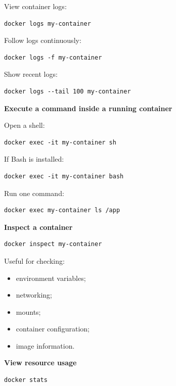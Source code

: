 \documentclass[11pt,letterpaper]{article}
\begin{document}
View container logs:

\begin{lstlisting}
docker logs my-container
\end{lstlisting}

Follow logs continuously:

\begin{lstlisting}
docker logs -f my-container
\end{lstlisting}

Show recent logs:

\begin{lstlisting}
docker logs --tail 100 my-container
\end{lstlisting}

\textbf{Execute a command inside a running container}

Open a shell:

\begin{lstlisting}
docker exec -it my-container sh
\end{lstlisting}

If Bash is installed:

\begin{lstlisting}
docker exec -it my-container bash
\end{lstlisting}

Run one command:

\begin{lstlisting}
docker exec my-container ls /app
\end{lstlisting}

\textbf{Inspect a container}

\begin{lstlisting}
docker inspect my-container
\end{lstlisting}

Useful for checking:

\begin{itemize}[leftmargin=*]
    \item environment variables;
    \item networking;
    \item mounts;
    \item container configuration;
    \item image information.
\end{itemize}

\textbf{View resource usage}

\begin{lstlisting}
docker stats
\end{lstlisting}
\end{document}
